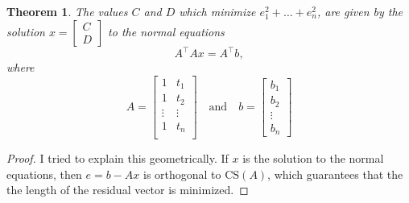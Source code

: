 \documentclass[10pt]{article}
\newtheorem{theorem}{Theorem}
\newtheorem{proposition}[theorem]{Proposition}
\theoremstyle{definition}
\newcommand{\norm}[1]{\left\lVert#1\right\rVert} %
\newcommand{\1}[1]{\textbf{1}_{\left[#1\right]}} %
\newcommand{\dempfcolor}[1]{{\color{RoyalBlue}#1}}
\newcommand{\demph}[1]{\dempfcolor{{\sl \textbf{#1}}}}
\begin{document}
\begin{theorem}
  The values $C$ and $D$ which minimize $e_{1}^{2}+\ldots+e_{n}^{2}$, are
  given by the solution $x=
  \begin{bmatrix}
    C\\D
  \end{bmatrix}
  $ to the normal equations
  \begin{equation*}
    A^{\top}Ax=A^{\top}b,
  \end{equation*}
  where
  \begin{equation*}
    A =
    \begin{bmatrix}
      1&t_{1}\\
      1&t_{2}\\
      \vdots&\vdots\\
      1&t_{n}\\
    \end{bmatrix}
    \quad \text{and} \quad
    b =
    \begin{bmatrix}
      b_{1}\\b_{2}\\\vdots \\b_{n}
    \end{bmatrix}
  \end{equation*}
\end{theorem}
\begin{proof}
  I tried to explain this geometrically. If $x$ is the solution to the normal
  equations, then $e=b-Ax$ is orthogonal to $\text{CS}(A)$, which guarantees
  that the the length of the residual vector is minimized.
\end{proof}



\end{document}
